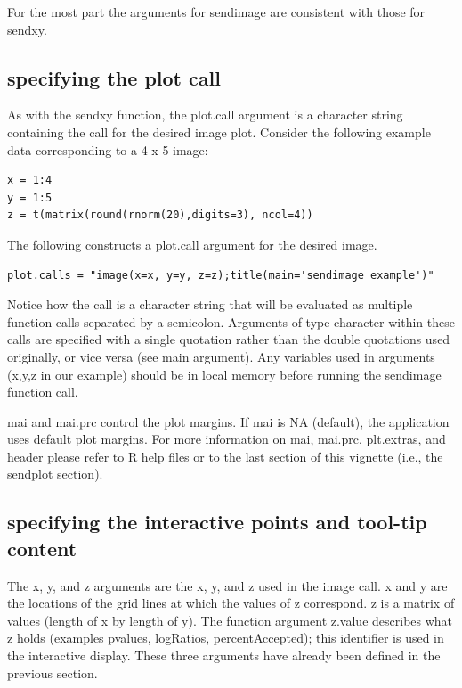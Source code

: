 \documentclass[]{article}
\begin{document}
For the most part the arguments for sendimage are consistent with those for sendxy. 

\subsection{specifying the plot call}
As with the sendxy function, the plot.call argument is a character string containing the call for the desired image plot. Consider the following example data corresponding to a 4 x 5 image:
\begin{verbatim}
x = 1:4
y = 1:5
z = t(matrix(round(rnorm(20),digits=3), ncol=4))
\end{verbatim}



The following constructs a plot.call argument for the desired image. 

\begin{verbatim}
plot.calls = "image(x=x, y=y, z=z);title(main='sendimage example')"
\end{verbatim}


Notice how the call is a character string that will be evaluated as multiple function calls separated by a semicolon.  Arguments of type character within these calls are specified with a single quotation rather than the double quotations used originally, or vice versa (see main argument). Any variables used in arguments (x,y,z in our example) should be in local memory before running the sendimage function call. \newline


\indent mai and mai.prc control the plot margins. If mai is NA (default), the application uses default plot margins. For more information on mai, mai.prc, plt.extras, and header please refer to R help files or to the last section of this vignette (i.e., the sendplot section). \newline


\subsection{specifying the interactive points and tool-tip content}

\indent The x, y, and z arguments are the x, y, and z used in the image call. x and y are the locations of the grid lines at which the values of z correspond. z is a matrix of values (length of x  by length of y). The function argument z.value describes what z holds (examples pvalues, logRatios, percentAccepted); this identifier is used in the interactive display. These three arguments have already been defined in the previous section. \\
\end{document}
